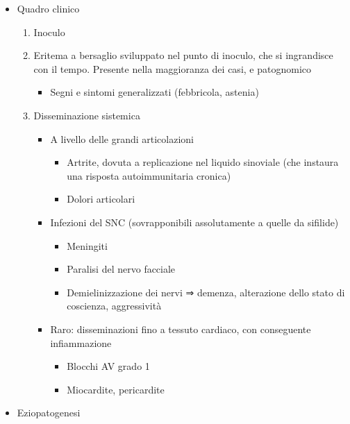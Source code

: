 \documentclass[italian,]{article}
\providecommand{\tightlist}{%
  \setlength{\itemsep}{0pt}\setlength{\parskip}{0pt}}
\begin{document}
\begin{itemize}
\tightlist
\item
  Quadro clinico

  \begin{enumerate}
  \def\labelenumi{\arabic{enumi}.}
  \setcounter{enumi}{-1}
  \tightlist
  \item
    Inoculo
  \item
    Eritema a
    bersaglio sviluppato nel punto di inoculo, che si ingrandisce con il
    tempo. Presente nella maggioranza dei casi, e patognomico

    \begin{itemize}
    \tightlist
    \item
      Segni e sintomi generalizzati (febbricola, astenia)
    \end{itemize}
  \item
    Disseminazione sistemica

    \begin{itemize}
    \tightlist
    \item
      A livello delle grandi articolazioni

      \begin{itemize}
      \tightlist
      \item
        Artrite, dovuta a replicazione nel liquido sinoviale (che
        instaura una risposta autoimmunitaria cronica)
      \item
        Dolori articolari
      \end{itemize}
    \item
      Infezioni del SNC (sovrapponibili assolutamente a quelle da
      sifilide)

      \begin{itemize}
      \tightlist
      \item
        Meningiti
      \item
        Paralisi del nervo facciale
      \item
        Demielinizzazione dei nervi ⇒ demenza, alterazione dello stato
        di coscienza, aggressività
      \end{itemize}
    \item
      Raro: disseminazioni fino a tessuto cardiaco, con conseguente
      infiammazione

      \begin{itemize}
      \tightlist
      \item
        Blocchi AV grado 1
      \item
        Miocardite, pericardite
      \end{itemize}
    \end{itemize}
  \end{enumerate}
\item
  Eziopatogenesi


\end{itemize}
\end{document}
